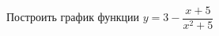 \begin{ex}[type=none]
	\begin{condition}
		Построить график функции \( y=3-\dfrac{x+5}{x^2+5} \)
	\end{condition}
\end{ex}